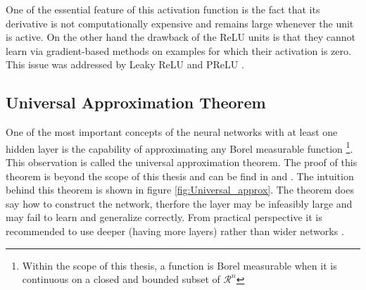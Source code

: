 One of the essential feature of this activation function is the fact that its derivative is not computationally expensive and remains large whenever the unit is active. On the other hand the drawback of the ReLU units is that they cannot learn via gradient-based methods on examples for which their activation is zero.
This issue was addressed by Leaky ReLU \cite{LeakyReLU} and PReLU \cite{PReLU}. 

\subsection{Universal Approximation Theorem}

One of the most important concepts of the neural networks with at least one hidden layer is the capability of approximating any Borel measurable function \footnote{Within the scope of this thesis, a function is Borel measurable when it is continuous on a closed and bounded subset of $\mathcal{R}^{n}$}. This observation is called the universal approximation theorem. The proof of this theorem is beyond the scope of this thesis and can be find in  \cite{Universal_approx_1} and \cite{Universal_approx_2}. The intuition behind this theorem is shown in figure \ref{fig:Universal_approx}.
The theorem does say how to construct the network, therfore the layer may be infeasibly large and may fail to learn and generalize correctly. From practical perspective it is recommended to use deeper (having more layers) rather than wider networks \cite{Relu_regions}. 

